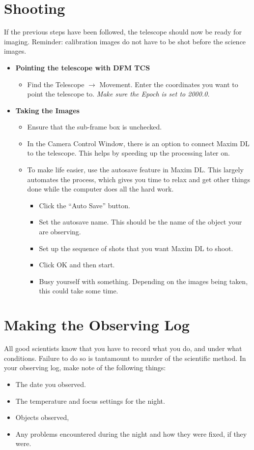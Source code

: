 \documentclass[letterpaper, 12pt]{report}
\begin{document}
\chapter{Shooting}\label{ch:shooting}

If the previous steps have been followed, the telescope should now be ready for imaging. Reminder: calibration images do not have to be shot before the science images.

\begin{itemize}
	\item {\large \textbf{Pointing the telescope with DFM TCS}}
	\begin{itemize}
		\item Find the Telescope $\rightarrow$ Movement. Enter the coordinates you want to point the telescope to. {\large \emph{Make sure the Epoch is set to 2000.0.}}
	\end{itemize}
	\item {\large \textbf{Taking the Images}}
	\begin{itemize}
		\item Ensure that the sub-frame box is unchecked.
		\item In the Camera Control Window, there is an option to connect Maxim DL to the telescope. This helps by speeding up the processing later on.
		\item To make life easier, use the autosave feature in Maxim DL. This largely automates the process, which gives you time to relax and get other things done while the computer does all the hard work.
		\begin{itemize}
			\item Click the ``Auto Save'' button.
			\item Set the autosave name. This should be the name of the object your are observing.
			\item Set up the sequence of shots that you want Maxim DL to shoot.
			\item Click OK and then start.
			\item Busy yourself with something. Depending on the images being taken, this could take some time.
		\end{itemize}
	\end{itemize}
\end{itemize}

\newpage

\chapter{Making the Observing Log}\label{ch:log}
All good scientists know that you have to record what you do, and under what conditions. Failure to do so is tantamount to murder of the scientific method. In your observing log, make note of the following things:
\begin{itemize}
	\item The date you observed.
	\item The temperature and focus settings for the night.
	\item Objects observed,
	\item Any problems encountered during the night and how they were fixed, if they were.
\end{itemize}
\end{document}
